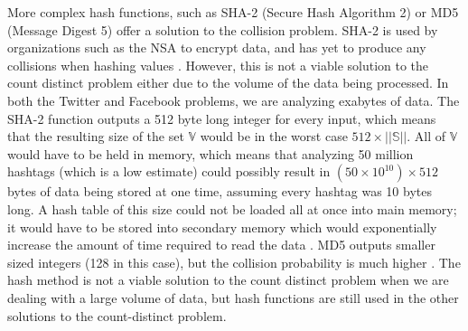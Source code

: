 \documentclass{article}
\begin{document}
\indent More complex hash functions, such as SHA-2 (Secure Hash Algorithm 2) or MD5 (Message Digest 5) offer a solution to the collision problem. SHA-2 is used by organizations such as the NSA to encrypt data, and has yet to produce any collisions when hashing values \cite[p. 301]{SHA-Algo}. However, this is not a viable solution to the count distinct problem either due to the volume of the data being processed. In both the Twitter and Facebook problems, we are analyzing exabytes of data. The SHA-2 function outputs a 512 byte long integer for every input, which means that the resulting size of the set $\mathbb{V}$ would be in the worst case $512 \times ||\mathbb{S}||$. All of $\mathbb{V}$ would have to be held in memory, which means that analyzing 50 million hashtags (which is a low estimate)\cite{Twitter} could possibly result in $(50 \times 10^{10}) \times 512$ bytes of data being stored at one time, assuming every hashtag was 10 bytes long. A hash table of this size could not be loaded all at once into main memory; it would have to be stored into secondary memory which would exponentially increase the amount of time required to read the data \cite[p. 209]{Whang}. MD5 outputs smaller sized integers (128 in this case), but the collision probability is much higher \cite[p. 22 - 23]{Break-MD5}. The hash method is not a viable solution to the count distinct problem when we are dealing with a large volume of data, but hash functions are still used in the other solutions to the count-distinct problem.\\
\end{document}
